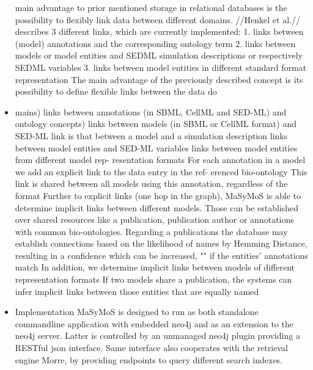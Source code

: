 \begin{itemize}
		\subitem main advantage to prior mentioned storage in relational databases is the possibility to flexibly link data between different domains. //Henkel et al.// describes 3 different links, which are currently implemented: 1. links between (model) annotations and the corresponding ontology term 2. links between models or model entities and SEDML simulation descriptions or respectively SEDML variables 3. links between model entities in different standard format representation
			\subsubitem \cite{Henkel2015} The main advantage of the previously described concept is its possibility to define flexible links between the data do\item mains)
			\subsubitem \cite{Henkel2015} links between annotations (in SBML, CellML and SED-ML) and ontology concepts)
			\subsubitem \cite{Henkel2015} links between models (in SBML or CellML format) and SED-ML
			\subsubitem \cite{Henkel2015} link is that between a model and a simulation description
			\subsubitem \cite{Henkel2015} links between model entities and SED-ML variables
			\subsubitem \cite{Henkel2015} links between model entities from different model rep- resentation formats
		\subitem \cite{Henkel2015} For each annotation in a model we add an explicit link to the data entry in the ref- erenced bio-ontology
		\subitem This link is shared between all models using this annotation, regardless of the format
		\subitem Further to explicit links (one hop in the graph), MaSyMoS is able to determine implicit links between different models. Those can be established over shared resources like a publication, publication author or annotations with common bio-ontologies. Regarding a publications the database may establish connections based on the likelihood of names by Hemming Distance, resulting in a confidence which can be increased, "" if the entities' annotations match
			\subsubitem \cite{Henkel2015} In addition, we determine implicit links between models of different representation formats
			\subsubitem \cite{Henkel2015} If two models share a publication, the systems can infer implicit links between those entities that are equally named
	\item Implementation
		\subitem MaSyMoS is designed to run as both standalone commandline application with embedded neo4j and as an extension to the neo4j server. Latter is controlled by an unmanaged neo4j plugin providing a RESTful json interface.
		\subitem Same interface also cooperates with the retrieval engine Morre, by providing endpoints to query different search indexes.
		

\end{itemize}
